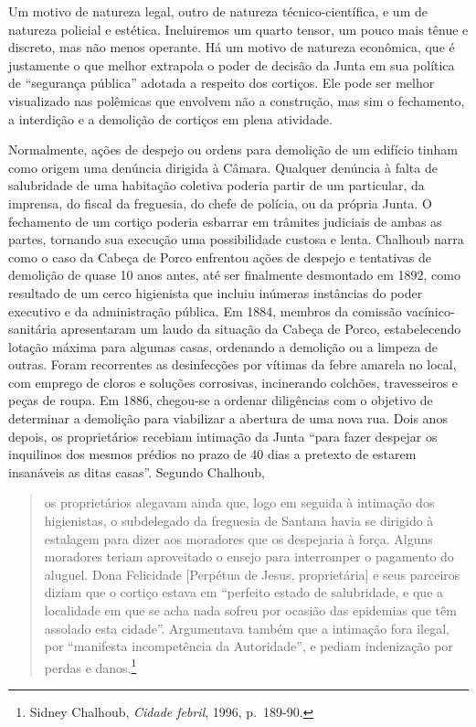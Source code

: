 Um motivo de natureza legal, outro de natureza técnico-científica, e um
de natureza policial e estética. Incluiremos um quarto tensor, um pouco
mais tênue e discreto, mas não menos operante. Há um motivo de natureza
econômica, que é justamente o que melhor extrapola o poder de decisão da
Junta em sua política de ``segurança pública'' adotada a respeito dos
cortiços. Ele pode ser melhor visualizado nas polêmicas que envolvem não
a construção, mas sim o fechamento, a interdição e a demolição de
cortiços em plena atividade.

Normalmente, ações de despejo ou ordens para demolição de um edifício
tinham como origem uma denúncia dirigida à Câmara. Qualquer denúncia à
falta de salubridade de uma habitação coletiva poderia partir de um
particular, da imprensa, do fiscal da freguesia, do chefe de polícia, ou
da própria Junta. O fechamento de um cortiço poderia esbarrar em
trâmites judiciais de ambas as partes, tornando sua execução uma
possibilidade custosa e lenta. Chalhoub narra como o caso da Cabeça de
Porco enfrentou ações de despejo e tentativas de demolição de quase 10
anos antes, até ser finalmente desmontado em 1892, como resultado de um
cerco higienista que incluiu inúmeras instâncias do poder executivo e da
administração pública. Em 1884, membros da comissão vacínico-sanitária
apresentaram um laudo da situação da Cabeça de Porco, estabelecendo
lotação máxima para algumas casas, ordenando a demolição ou a limpeza de
outras. Foram recorrentes as desinfecções por vítimas da febre amarela
no local, com emprego de cloros e soluções corrosivas, incinerando
colchões, travesseiros e peças de roupa. Em 1886, chegou-se a ordenar
diligências com o objetivo de determinar a demolição para viabilizar a
abertura de uma nova rua. Dois anos depois, os proprietários recebiam
intimação da Junta ``para fazer despejar os inquilinos dos mesmos
prédios no prazo de 40 dias a pretexto de estarem insanáveis as ditas
casas''. Segundo Chalhoub,

\begin{quote}
os proprietários alegavam ainda que, logo em seguida à intimação dos
higienistas, o subdelegado da freguesia de Santana havia se dirigido à
estalagem para dizer aos moradores que os despejaria à força. Alguns
moradores teriam aproveitado o ensejo para interromper o pagamento do
aluguel. Dona Felicidade {[}Perpétua de Jesus, proprietária{]} e seus
parceiros diziam que o cortiço estava em ``perfeito estado de
salubridade, e que a localidade em que se acha nada sofreu por ocasião
das epidemias que têm assolado esta cidade''. Argumentava também que a
intimação fora ilegal, por ``manifesta incompetência da Autoridade'', e
pediam indenização por perdas e danos.\footnote{Sidney Chalhoub,
  \emph{Cidade febril}, 1996, p.~189-90.}
\end{quote}

